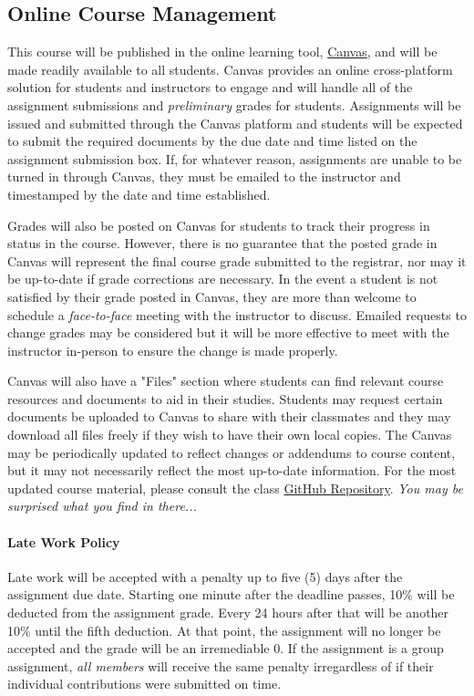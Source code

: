 \documentclass[
	letterpaper, %
	fontsize=10pt, %
	twoside=true, %
	numbers=noenddot, %
]{kaobook}
\begin{document}
\subsection*{Online Course Management} \label{ssec:course_mgmt}
This course will be published in the online learning tool, \href{https://fit.instructure.com/}{Canvas}, and will be made readily available to all students. 
Canvas provides an online cross-platform solution for students and instructors to engage and will handle all of the assignment submissions and \emph{preliminary} grades for students.
Assignments will be issued and submitted through the Canvas platform and students will be expected to submit the required documents by the due date and time listed on the assignment submission box.
If, for whatever reason, assignments are unable to be turned in through Canvas, they must be emailed to the instructor and timestamped by the date and time established.

Grades will also be posted on Canvas for students to track their progress in status in the course.
However, there is no guarantee that the posted grade in Canvas will represent the final course grade submitted to the registrar, nor may it be up-to-date if grade corrections are necessary.
In the event a student is not satisfied by their grade posted in Canvas, they are more than welcome to schedule a \emph{face-to-face} meeting with the instructor to discuss.
Emailed requests to change grades may be considered but it will be more effective to meet with the instructor in-person to ensure the change is made properly.

Canvas will also have a "Files" section where students can find relevant course resources and documents to aid in their studies.
Students may request certain documents be uploaded to Canvas to share with their classmates and they may download all files freely if they wish to have their own local copies.
The Canvas may be periodically updated to reflect changes or addendums to course content, but it may not necessarily reflect the most up-to-date information.
For the most updated course material, please consult the class \href{https://github.com/Legohead259/OCE2901-Materials}{GitHub Repository}. \emph{You may be surprised what you find in there...}

\paragraph*{Late Work Policy} Late work will be accepted with a penalty up to five (5) days after the assignment due date.
Starting one minute after the deadline passes, 10\% will be deducted from the assignment grade.
Every 24 hours after that will be another 10\% until the fifth deduction.
At that point, the assignment will no longer be accepted and the grade will be an irremediable 0.
If the assignment is a group assignment, \emph{all members} will receive the same penalty irregardless of if their individual contributions were submitted on time.
\end{document}
